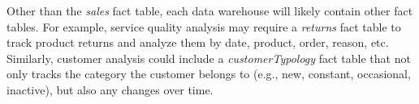 Other than the \textit{sales} fact table, each data warehouse will likely contain other fact tables. For example, service quality analysis may require a \textit{returns} fact table to track product returns and analyze them by date, product, order, reason, etc. Similarly, customer analysis could include a \textit{customerTypology} fact table that not only tracks the category the customer belongs to (e.g., new, constant, occasional, inactive), but also any changes over time.